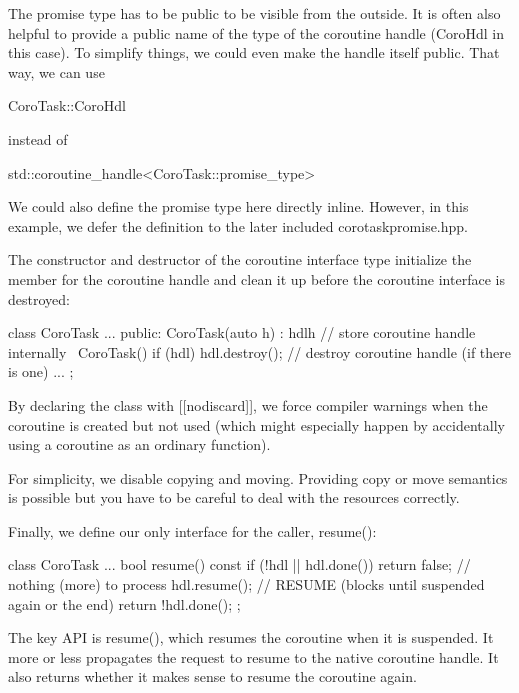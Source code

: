 The promise type has to be public to be visible from the outside. It is often also helpful to provide a public name of the type of the coroutine handle (CoroHdl in this case). To simplify things, we could even make the handle itself public. That way, we can use

\begin{cpp}
CoroTask::CoroHdl
\end{cpp}

instead of

\begin{cpp}
std::coroutine_handle<CoroTask::promise_type>
\end{cpp}

We could also define the promise type here directly inline. However, in this example, we defer the definition to the later included corotaskpromise.hpp.

The constructor and destructor of the coroutine interface type initialize the member for the coroutine handle and clean it up before the coroutine interface is destroyed:

\begin{cpp}
class CoroTask {
	...
	public:
	CoroTask(auto h)
	: hdl{h} { // store coroutine handle internally
	}
	~CoroTask() {
		if (hdl) {
			hdl.destroy(); // destroy coroutine handle (if there is one)
		}
	}
	...
};
\end{cpp}

By declaring the class with [[nodiscard]], we force compiler warnings when the coroutine is created but not used (which might especially happen by accidentally using a coroutine as an ordinary function).

For simplicity, we disable copying and moving. Providing copy or move semantics is possible but you have to be careful to deal with the resources correctly.

Finally, we define our only interface for the caller, resume():

\begin{cpp}
class CoroTask {
	...
	bool resume() const {
		if (!hdl || hdl.done()) {
			return false; // nothing (more) to process
		}
		hdl.resume(); // RESUME (blocks until suspended again or the end)
		return !hdl.done();
	}
};
\end{cpp}

The key API is resume(), which resumes the coroutine when it is suspended. It more or less propagates the request to resume to the native coroutine handle. It also returns whether it makes sense to resume the coroutine again.

